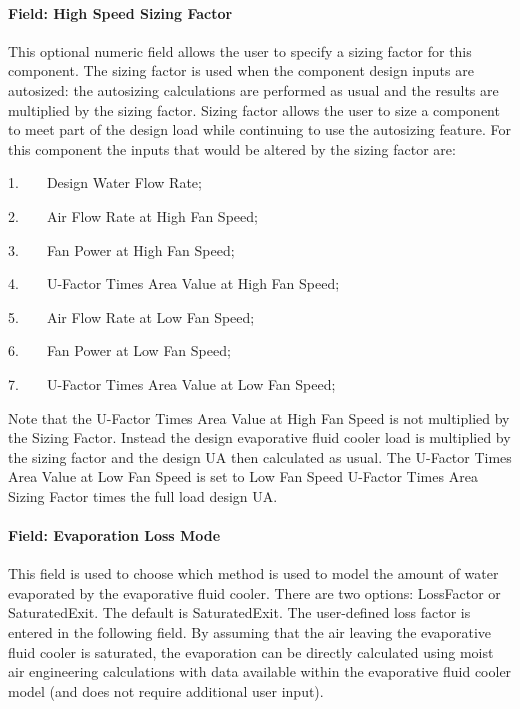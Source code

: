 \paragraph{Field: High Speed Sizing Factor}\label{field-high-speed-sizing-factor}

This optional numeric field allows the user to specify a sizing factor for this component. The sizing factor is used when the component design inputs are autosized: the autosizing calculations are performed as usual and the results are multiplied by the sizing factor. Sizing factor allows the user to size a component to meet part of the design load while continuing to use the autosizing feature. For this component the inputs that would be altered by the sizing factor are:

1.~~~~Design Water Flow Rate;

2.~~~~Air Flow Rate at High Fan Speed;

3.~~~~Fan Power at High Fan Speed;

4.~~~~U-Factor Times Area Value at High Fan Speed;

5.~~~~Air Flow Rate at Low Fan Speed;

6.~~~~Fan Power at Low Fan Speed;

7.~~~~U-Factor Times Area Value at Low Fan Speed;

Note that the U-Factor Times Area Value at High Fan Speed is not multiplied by the Sizing Factor. Instead the design evaporative fluid cooler load is multiplied by the sizing factor and the design UA then calculated as usual. The U-Factor Times Area Value at Low Fan Speed is set to Low Fan Speed U-Factor Times Area Sizing Factor times the full load design UA.

\paragraph{Field: Evaporation Loss Mode}\label{field-evaporation-loss-mode-5}

This field is used to choose which method is used to model the amount of water evaporated by the evaporative fluid cooler. There are two options: LossFactor or SaturatedExit. The default is SaturatedExit. The user-defined loss factor is entered in the following field. By assuming that the air leaving the evaporative fluid cooler is saturated, the evaporation can be directly calculated using moist air engineering calculations with data available within the evaporative fluid cooler model (and does not require additional user input).

